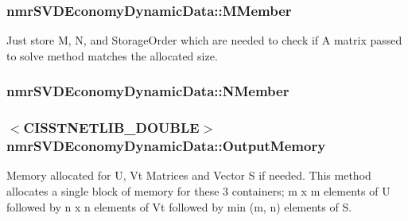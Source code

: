 \subsubsection[{M\+Member}]{ nmr\+S\+V\+D\+Economy\+Dynamic\+Data\+::\+M\+Member\hspace{0.3cm}{\ttfamily [protected]}}\label{classnmr_s_v_d_economy_dynamic_data_a850f29c6d2376c0f87b56b66c0fccfa5}
Just store M, N, and Storage\+Order which are needed to check if A matrix passed to solve method matches the allocated size. \hypertarget{classnmr_s_v_d_economy_dynamic_data_ae4ce223f5b2cd6171d09810aa08a7a8b}{}
\subsubsection[{N\+Member}]{ nmr\+S\+V\+D\+Economy\+Dynamic\+Data\+::\+N\+Member\hspace{0.3cm}{\ttfamily [protected]}}\label{classnmr_s_v_d_economy_dynamic_data_ae4ce223f5b2cd6171d09810aa08a7a8b}
\hypertarget{classnmr_s_v_d_economy_dynamic_data_ad990316888e2acec08d79e59a4284fa4}{}
\subsubsection[{Output\+Memory}]{$<$C\+I\+S\+S\+T\+N\+E\+T\+L\+I\+B\+\_\+\+D\+O\+U\+B\+L\+E$>$ nmr\+S\+V\+D\+Economy\+Dynamic\+Data\+::\+Output\+Memory\hspace{0.3cm}{\ttfamily [protected]}}\label{classnmr_s_v_d_economy_dynamic_data_ad990316888e2acec08d79e59a4284fa4}
Memory allocated for U, Vt Matrices and Vector S if needed. This method allocates a single block of memory for these 3 containers; m x m elements of U followed by n x n elements of Vt followed by min (m, n) elements of S. \hypertarget{classnmr_s_v_d_economy_dynamic_data_a5f21313bc7280084d7855b4a772960d7}{}
